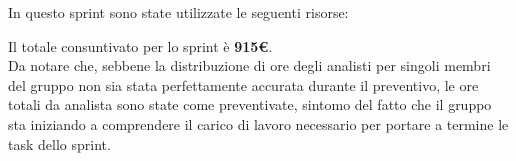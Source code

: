 In questo sprint sono state utilizzate le seguenti risorse:
\begin{table}[H]
	\centering
	\caption{Sprint 4: Consuntivo}
\end{table}
Il totale consuntivato per lo sprint è \textbf{915€}.\\

Da notare che, sebbene la distribuzione di ore degli analisti per singoli membri del gruppo non sia stata perfettamente accurata durante il preventivo, le ore totali da analista sono state come preventivate, sintomo del fatto che il gruppo sta iniziando a comprendere il carico di lavoro necessario per portare a termine le task dello sprint. 

